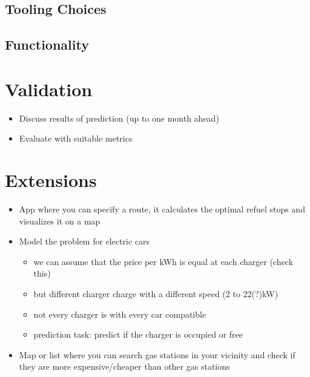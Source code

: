 \documentclass[%
a4paper,
DIV12,
2.5headlines,
bigheadings,
titlepage,
openbib,
]{scrartcl}
\begin{document}
\subsection{Tooling Choices}\label{tooling-choices}



\subsection{Functionality}\label{functionality}



\section{Validation}\label{validation}
\begin{itemize}
\item Discuss results of prediction (up to one month ahead)
\item Evaluate with suitable metrics
\end{itemize}


\section{Extensions}\label{extensions}
\begin{itemize}
\item App where you can specify a route, it calculates the optimal refuel stops and visualizes it on a map
\item Model the problem for electric cars

\begin{itemize}
\item we can assume that the price per kWh is equal at each charger (check this)\\
\item but different charger charge with a different speed (2 to 22(?)kW)\\
\item not every charger is with every car compatible\\
\item prediction task: predict if the charger is occupied or free\\
\end{itemize}

\item Map or list where you can search gas stations in your vicinity and check if they are more expensive/cheaper than other gas stations
\end{itemize}


 
\end{document}
